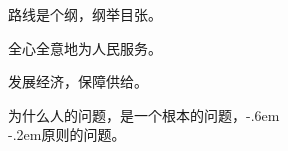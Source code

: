 \null%
\vspace{1.5\baselineskip}
\sffamily

\begin{center}
{%
	\huge\bfseries%
	{}
}
\end{center}

\begingroup%
\Large\bfseries%
\doublespacing%
\setlength{\parindent}{1.8em}%

路线是个纲，纲举目张。

全心全意地为人民服务。

发展经济，保障供给。

为什么人的问题，是一个根本的问题，\kern-.6em\\
\kern-.2em原则的问题。

\endgroup

